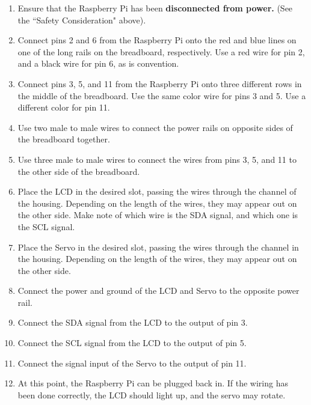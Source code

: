 \documentclass[titlepage]{article}
\begin{document}
\begin{enumerate}
\subsection*{Assembling}
    \item Ensure that the Raspberry Pi has been \textbf{disconnected from power.} (See the ``Safety Consideration" above).
    \item Connect pins 2 and 6 from the Raspberry Pi onto the red and blue lines on one of the long rails on the breadboard, respectively. Use a red wire for pin 2, and a black wire for pin 6, as is convention.
    \item Connect pins 3, 5, and 11 from the Raspberry Pi onto three different rows in the middle of the breadboard. Use the same color wire for pins 3 and 5. Use a different color for pin 11.  
    \item Use two male to male wires to connect the power rails on opposite sides of the breadboard together. 
    \item Use three male to male wires to connect the wires from pins 3, 5, and 11 to the other side of the breadboard. 
    \item Place the LCD in the desired slot, passing the wires through the channel of the housing. Depending on the length of the wires, they may appear out on the other side. Make note of which wire is the SDA signal, and which one is the SCL signal. 
    \item Place the Servo in the desired slot, passing the wires through the channel in the housing. Depending on the length of the wires, they may appear out on the other side. 
    \item Connect the power and ground of the LCD and Servo to the opposite power rail. 
    \item Connect the SDA signal from the LCD to the output of pin 3.
    \item Connect the SCL signal from the LCD to the output of pin 5.
    \item Connect the signal input of the Servo to the output of pin 11. 
    \item At this point, the Raspberry Pi can be plugged back in. If the wiring has been done correctly, the LCD should light up, and the servo may rotate. 

\end{enumerate}
\end{document}
